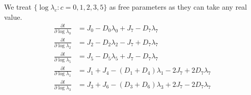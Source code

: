 \documentclass[11pt]{article}
\begin{document}
We treat $\{\log\lambda_c: c = 0,1,2,3,5\}$ as free parameters as they
can take any real value.
\begin{equation}
  \begin{aligned}
    \frac{\partial l}{\partial \log\lambda_0} &= J_0 - D_0\lambda_0 + J_7 - D_7\lambda_7\\
    \frac{\partial l}{\partial \log\lambda_2} &= J_2 - D_2\lambda_2 - J_7 + D_7\lambda_7 \\
    \frac{\partial l}{\partial \log\lambda_5} &= J_5 - D_5\lambda_5 + J_7 - D_7\lambda_7\\
    \frac{\partial l}{\partial \log\lambda_1} &= J_1 + J_4 - (D_1 + D_4)\lambda_1 - 2J_7 + 2D_7\lambda_7\\
    \frac{\partial l}{\partial \log\lambda_3} &= J_3 + J_6 - (D_3 + D_6)\lambda_3 + 2J_7 - 2D_7\lambda_7
  \end{aligned}
\end{equation}

\appendix
\end{document}
